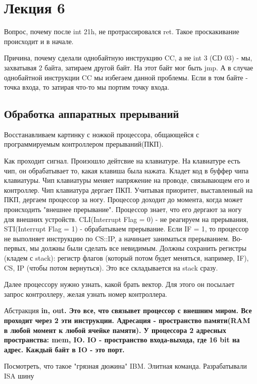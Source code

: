 \section{Лекция 6}
\begin{hw} Вопрос, почему после int 21h, не протрассировался ret. Такое проскакивание происходит и в начале.\end{hw}
Причина, почему сделали однобайтную инструкцию CC, а не int 3 (СD 03) - мы, захватывая 2 байта, затираем другой байт. На этот байт мог быть jmp. А в случае однобайтной инструкции CC мы избегаем данной проблемы. Если в том байте - точка входа, то затирая что-то мы портим точку входа. 

\subsection{Обработка аппаратных прерываний}
Восстанавливаем картинку с ножкой процессора, общающейся с программируемым контроллером прерываний(ПКП).  

Как проходит сигнал. Произошло дейтсвие на клавиатуре. На клавиатуре есть чип, он обрабатывает то, какая клавиша была нажата. Кладет код в буффер чипа клавиатуры. Чип клавиатуры меняет напряжение на проводе, связывающем его и контроллер. Чип клавиатура дергает ПКП. Учитывая приоритет, выставленный на ПКП, дергаем процессор за ногу. Процессор доходит до момента, когда может происходить "внешнее прерывание". Процессор знает, что его дергают за ногу для внешних устройств. CLI(Interrupt Flag = 0) - не реагируем на прерывания, STI(Interrupt Flag = 1) - обрабатываем прерывание. Если IF = 1, то процессор не выполняет инструкцию по CS::IP, а начинает заниматься прерыванием. Во-первых, мы должны были сделать все невидимым. Должны сохранить регистры (кладем с stack): регистр флагов (который потом будет меняться, например, IF), CS, IP (чтобы потом вернуться). Это все складывается на stack сразу. 

Далее процессору нужно узнать, какой брать вектор. Для этого он посылает запрос контроллеру, желая узнать номер контроллера.

Абстракция \bfseries in, out\mdseries. Это все, что связывет процессор с внешним миром. Все проходит через 2 эти инструкции. Адресация - пространство памяти(RAM в любой момент к любой ячейке памяти). У процессора 2 адресных пространства: mem, IO. IO - пространство входа-выхода, где 16 bit на адрес. Каждый байт в IO - это порт. 

\begin{rem} Посмотреть, что такое "грязная дюжина" IBM. Элитная команда. Разрабатывали ISA шину\end{rem}

